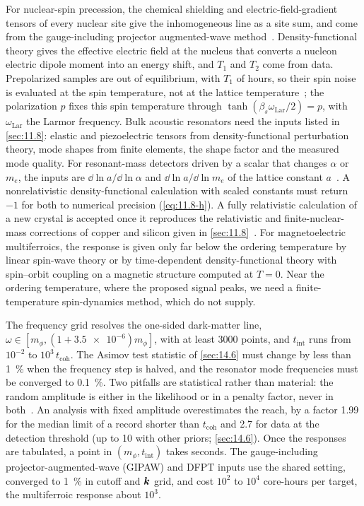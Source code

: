 For nuclear-spin precession, the chemical shielding and electric-field-gradient tensors of every nuclear site give the inhomogeneous line as a site sum, and come from the gauge-including projector augmented-wave method~\cite{pickard2001all}. Density-functional theory gives the effective electric field at the nucleus that converts a nucleon electric dipole moment into an energy shift, and $T_1$ and $T_2$ come from data. Prepolarized samples are out of equilibrium, with $T_1$ of hours, so their spin noise is evaluated at the spin temperature, not at the lattice temperature~\cite{budker2014proposal}; the polarization $p$ fixes this spin temperature through $\tanh(\beta_s\omega_{\mathrm{Lar}}/2) = p$, with $\omega_{\mathrm{Lar}}$ the Larmor frequency. Bulk acoustic resonators need the inputs listed in \cref{sec:11.8}: elastic and piezoelectric tensors from density-functional perturbation theory, mode shapes from finite elements, the shape factor and the measured mode quality. For resonant-mass detectors driven by a scalar that changes $\alpha$ or $m_e$, the inputs are $\dd\ln a/\dd\ln\alpha$ and $\dd\ln a/\dd\ln m_e$ of the lattice constant $a$~\cite{arvanitaki2016sound}. A nonrelativistic density-functional calculation with scaled constants must return $-1$ for both to numerical precision (\cref{eq:11.8-h}). A fully relativistic calculation of a new crystal is accepted once it reproduces the relativistic and finite-nuclear-mass corrections of copper and silicon given in \cref{sec:11.8}~\cite[Table~II]{pasteka2019material}. For magnetoelectric multiferroics, the response is given only far below the ordering temperature by linear spin-wave theory or by time-dependent density-functional theory with spin--orbit coupling on a magnetic structure computed at $T = 0$. Near the ordering temperature, where the proposed signal peaks, we need a finite-temperature spin-dynamics method, which  do not supply.

The frequency grid resolves the one-sided dark-matter line, $\omega \in [m_\phi, (1 + \num{3.5e-6})m_\phi]$, with at least 3000 points, and $t_{\mathrm{int}}$ runs from $10^{-2}$ to $10^3\,t_{\mathrm{coh}}$. The Asimov test statistic of \cref{sec:14.6} must change by less than \SI{1}{\percent} when the frequency step is halved, and the resonator mode frequencies must be converged to \SI{0.1}{\percent}. Two pitfalls are statistical rather than material: the random amplitude is either in the likelihood or in a penalty factor, never in both~\cite{centers2021stochastic}. An analysis with fixed amplitude overestimates the reach, by a factor 1.99 for the median limit of a record shorter than $t_{\mathrm{coh}}$ and 2.7 for data at the detection threshold (up to 10 with other priors; \cref{sec:14.6}). Once the responses are tabulated, a point in $(m_\phi, t_{\mathrm{int}})$ takes seconds. The gauge-including projector-augmented-wave (GIPAW) and DFPT inputs use the shared setting, converged to \SI{1}{\percent} in cutoff and $\bm{k}$ grid, and cost $10^{2}$ to $10^{4}$ core-hours per target, the multiferroic response about $10^{3}$.

